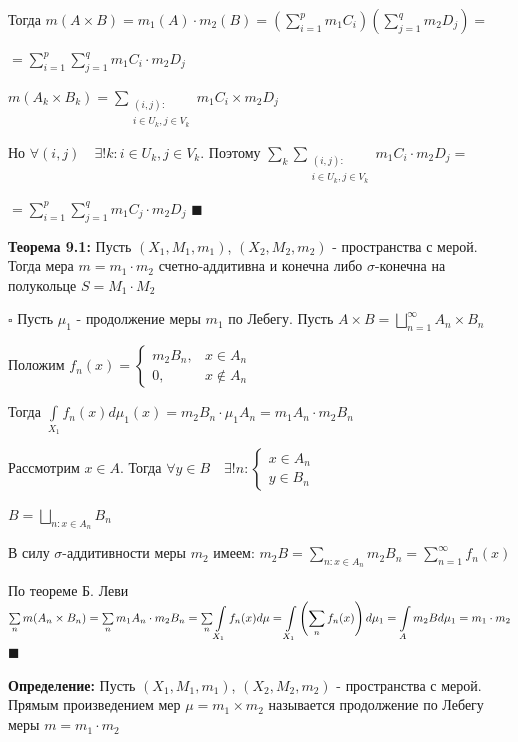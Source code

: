 \documentclass[a4paper]{report}
\newcommand*{\hm}[1]{#1\nobreak\discretionary{}%
            {\hbox{$\mathsurround=0pt #1$}}{}}
\begin{document}
Тогда $m(A\times B)=m_1(A)\cdot m_2(B)=\left(\sum\limits_{i=1}^p m_1C_i\right)\left(\sum\limits_{j=1}^q m_2 D_j\right)=$

\noindent$=\sum\limits_{i=1}^p\sum\limits_{j=1}^q m_1 C_i\cdot m_2 D_j$

$m(A_k\times B_k)=\sum\limits_{\substack{(i,j)\colon\\ i\in U_k, j\in V_k}}m_1 C_i\times m_2 D_j$

Но $\forall(i,j)\quad\exists!k\colon i\in U_k, j\in V_k$. Поэтому $\sum\limits_k\sum\limits_{\substack{(i,j)\colon\\ i\in U_k, j\in V_k}} m_1 C_i\cdot m_2 D_j=$

\noindent$=\sum\limits_{i=1}^p\sum\limits_{j=1}^q m_1 C_j\cdot m_2 D_j$ $\blacksquare$
\bigskip

\noindent\textbf{Теорема 9.1:} Пусть $(X_1,M_1,m_1)$, $(X_2,M_2,m_2)$ - пространства с мерой. Тогда мера $m=m_1\cdot m_2$ счетно-аддитивна и конечна либо $\sigma$-конечна на полукольце $S=M_1\cdot M_2$

\noindent $\square$ Пусть $\mu_1$ - продолжение меры $m_1$ по Лебегу. Пусть $A\times B=\bigsqcup\limits_{n=1}^\infty A_n\times B_n$

Положим $f_n(x)=\begin{cases}m_2 B_n,&x\in A_n\\0,&x\notin A_n\end{cases}$

Тогда $\displaystyle\int\limits_{X_1}f_n(x)d\mu_1(x)=m_2B_n\cdot\mu_1 A_n=m_1 A_n\cdot m_2 B_n$

Рассмотрим $x\in A$. Тогда $\forall y\in B\quad\exists! n\colon\begin{cases}x\in A_n\\y\in B_n\end{cases}$

$B=\bigsqcup\limits_{n\colon x\in A_n}B_n$

В силу $\sigma$-аддитивности меры $m_2$ имеем: $m_2 B=\sum\limits_{n\colon x\in A_n}m_2 B_n=\sum\limits_{n=1}^\infty f_n(x)$

По теореме Б. Леви $\sum\limits_n m(A_n\times B_n)=\sum\limits_n m_1 A_n\cdot m_2 B_n=\sum\limits_n\displaystyle\int\limits_{X_1}f_n(x)d\mu\hm=\displaystyle\int\limits_{X_1}\left(\sum\limits_n f_n(x)\right)d\mu_1=\displaystyle\int\limits_A m_2 Bd\mu_1=m_1\cdot m_2$ $\blacksquare$

\bigskip

\noindent\textbf{Определение:} Пусть $(X_1,M_1,m_1)$, $(X_2,M_2,m_2)$ - пространства с мерой. Прямым произведением мер $\mu=m_1\times m_2$ называется продолжение по Лебегу меры $m=m_1\cdot m_2$
\end{document}
